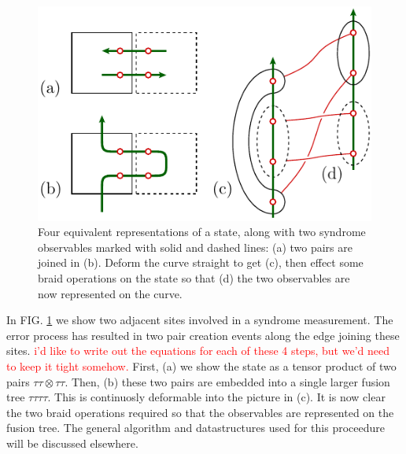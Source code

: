 \documentclass[aps, prl, letterpaper, twocolumn, superscriptaddress, notitlepage, 10pt]{revtex4-1}
\newcommand{\cggb}[1]{\textcolor{blue}{#1}}
\newcommand{\dude}[1]{\textcolor{red}{#1}}
\begin{document}
\begin{figure}[th!]
\begin{center}
	\includegraphics[width=1.0\columnwidth]{pic-syndrome.pdf}
\caption{Four equivalent representations of a state,
along with two syndrome observables marked with solid and dashed lines:
(a) two pairs are joined in (b).
Deform the curve straight to get (c),
then effect some
braid operations on the state so that (d) the two
observables are now represented on the curve. 
}
\label{f:syndrome}
\end{center}
\end{figure}

In FIG. \ref{f:syndrome} we show two adjacent sites
involved in a syndrome measurement.
The error process has resulted in two pair
creation events along the edge joining these sites.
\dude{i'd like to write out the equations for each of
these 4 steps, but we'd need to keep it tight somehow.}
First, (a) we show the state as a tensor product of two pairs $\tau\tau\otimes\tau\tau$.
Then, (b) these two pairs are embedded into a single larger fusion
tree $\tau\tau\tau\tau$.
This is continuosly deformable into the picture in (c).
It is now clear the two braid operations required so
that the observables are represented on the fusion tree.
The general algorithm and datastructures used
for this proceedure will be discussed elsewhere.
\end{document}
